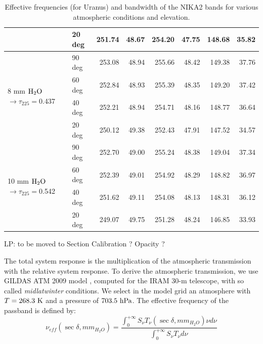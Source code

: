 \begin{table}[th]
\begin{center}
\begin{tabular}{|l|l|r|r|r|r|r|r|}
 & 20 deg & 251.74 & 48.67 & 254.20 & 47.75 & 148.68 & 35.82 \\
\hline
\multirow{4}{*}{8 mm $\rm H_2O$ $\rightarrow \tau_{225}=$0.437} & 90 deg &  253.08 & 48.94 & 255.66 & 48.42 & 149.38 & 37.76 \\
 & 60 deg & 252.84 & 48.93 & 255.39 & 48.35 & 149.20 & 37.42 \\
 & 40 deg & 252.21 & 48.94 & 254.71 & 48.16 & 148.77 & 36.64 \\
 & 20 deg & 250.12 & 49.38 & 252.43 & 47.91 & 147.52 & 34.57 \\
\hline
\multirow{4}{*}{10 mm $\rm H_2O$ $\rightarrow \tau_{225}=$0.542} & 90 deg &  252.70 & 49.00 & 255.24 & 48.38 & 149.04 & 37.34 \\
 & 60 deg & 252.39 & 49.01 & 254.92 & 48.29 & 148.82 & 36.97 \\
 & 40 deg & 251.62 & 49.11 & 254.08 & 48.13 & 148.31 & 36.12 \\
 & 20 deg & 249.07 & 49.75 & 251.28 & 48.24 & 146.85 & 33.93 \\
\hline
\end{tabular}
\caption[Effective frequencies and bandwidthes]{Effective frequencies (for Uranus) and bandwidth of the NIKA2 bands for
  various atmospheric conditions and elevation.}
\label{tab:bandwidths}
\end{center}
\end{table}


{\color{red} LP: to be moved to Section Calibration ? Opacity ? }


The total system response is the multiplication of the atmospheric
transmission with the relative system response. To derive the
atmospheric transmission, we use GILDAS ATM 2009 model \cite{ATM}, computed for
the IRAM 30-m telescope, with so called {\it midlatwinter} conditions. We select in the model
grid an atmosphere with $T=268.3 \ {\rm K}$ and a pressure of $703.5 \ {\rm hPa}$. The
effective frequency of the passband is defined by:
\begin{equation}
\nu_{eff}( \sec \delta, mm_{H_{2}O}) = \frac{ \int_{0}^{+\infty} S_{\nu}
  T_{\nu}(\sec \delta, mm_{H_{2}O}) \nu d\nu } { \int_{0}^{+\infty} S_{\nu} T_{\nu} d\nu}
\label{eq:nueff0}
\end{equation}

